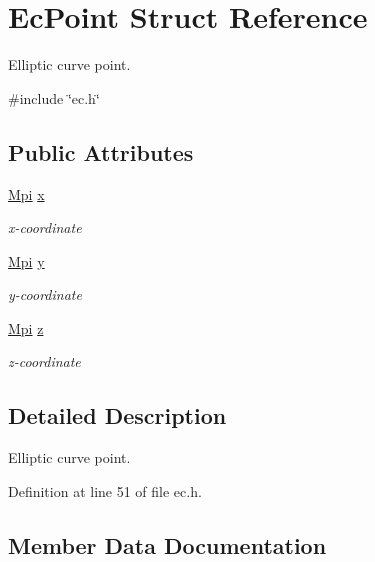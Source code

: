 \hypertarget{structEcPoint}{}\section{Ec\+Point Struct Reference}
\label{structEcPoint}


Elliptic curve point.  




{\ttfamily \#include \char`\"{}ec.\+h\char`\"{}}

\subsection*{Public Attributes}
\begin{DoxyCompactItemize}
\item 
\hyperlink{structMpi}{Mpi} \hyperlink{structEcPoint_a08f3fbb7a7d07607306bd8d6200629af}{x}
\begin{DoxyCompactList}\small\item\em x-\/coordinate \end{DoxyCompactList}\item 
\hyperlink{structMpi}{Mpi} \hyperlink{structEcPoint_a2102dff813849bd0eaed8a1a5e64ec1f}{y}
\begin{DoxyCompactList}\small\item\em y-\/coordinate \end{DoxyCompactList}\item 
\hyperlink{structMpi}{Mpi} \hyperlink{structEcPoint_ac53a6ff4888f818509027e37004635f5}{z}
\begin{DoxyCompactList}\small\item\em z-\/coordinate \end{DoxyCompactList}\end{DoxyCompactItemize}


\subsection{Detailed Description}
Elliptic curve point. 

Definition at line 51 of file ec.\+h.



\subsection{Member Data Documentation}
\mbox{\label{structEcPoint_a08f3fbb7a7d07607306bd8d6200629af}} 
